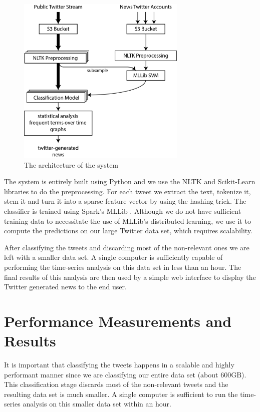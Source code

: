 \documentclass{llncs}
\begin{document}
\begin{figure}
	\centering
	\includegraphics[width=0.72\textwidth]{images/system_arch_2.png} 
	\caption{The architecture of the system}
	\label{fig:architecture}
\end{figure}

The system is entirely built using Python \cite{python} and we use the NLTK \cite{nltk} and Scikit-Learn \cite{scikit-learn} libraries to do the preprocessing. For each tweet we extract the text, tokenize it, stem it and turn it into a sparse feature vector by using the hashing trick. The classifier is trained using Spark's MLLib \cite{mllib}. Although we do not have sufficient training data to necessitate the use of MLLib's distributed learning, we use it to compute the predictions on our large Twitter data set, which requires scalability.

After classifying the tweets and discarding most of the non-relevant ones we are left with a smaller data set. A single computer is sufficiently capable of performing the time-series analysis on this data set in less than an hour. The final results of this analysis are then used by a simple web interface to display the Twitter generated news to the end user.

\section{Performance Measurements and Results}
It is important that classifying the tweets happens in a scalable and highly performant manner since we are classifying our entire data set (about $600\text{GB}$). This classification stage discards most of the non-relevant tweets and the resulting data set is much smaller. A single computer is sufficient to run the time-series analysis on this smaller data set within an hour.
\end{document}
